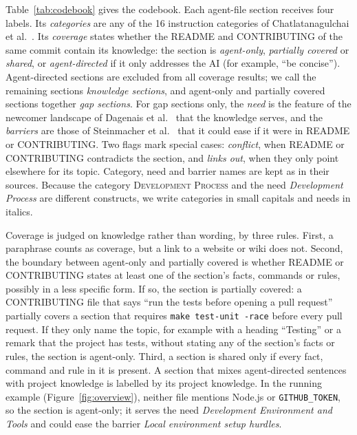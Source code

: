 \documentclass[sigconf,nonacm]{acmart}
\begin{document}
Table~\ref{tab:codebook} gives the codebook. Each agent-file section receives four labels. Its
\emph{categories} are any of the 16 instruction categories of Chatlatanagulchai et
al.~\cite{chatlatanagulchai2026agentreadmes}. Its \emph{coverage} states whether the README and
CONTRIBUTING of the same commit contain its knowledge: the section is \emph{agent-only},
\emph{partially covered} or \emph{shared}, or \emph{agent-directed} if it only addresses the AI (for
example, ``be concise''). Agent-directed sections are excluded from all coverage results; we call the
remaining sections \emph{knowledge sections}, and agent-only and partially covered sections
together \emph{gap sections}. For gap sections only, the \emph{need} is the feature of the newcomer
landscape of Dagenais et al.~\cite{dagenais2010landscape} that the knowledge serves, and the
\emph{barriers} are those of Steinmacher et al.~\cite{steinmacher2015barriers,santos2024onboarding}
that it could ease if it were in README or CONTRIBUTING. Two flags mark special cases:
\emph{conflict}, when README or CONTRIBUTING contradicts the section, and \emph{links out}, when they
only point elsewhere for its topic. Category, need and barrier names are kept as in their sources.
Because the category \textsc{Development Process} and the need \emph{Development Process} are
different constructs, we write categories in small capitals and needs in italics.

Coverage is judged on knowledge rather than wording, by three rules. First, a paraphrase counts as
coverage, but a link to a website or wiki does not. Second, the boundary between agent-only and
partially covered is whether README or CONTRIBUTING states at least one of the section's facts,
commands or rules, possibly in a less specific form. If so, the section is partially covered: a
CONTRIBUTING file that says ``run the tests before opening a pull request'' partially covers a
section that requires \texttt{make test-unit -race} before every pull request. If they only name the
topic, for example with a heading ``Testing'' or a remark that the project has tests, without
stating any of the section's facts or rules, the section is agent-only. Third, a section is shared
only if every fact, command and rule in it is present. A section that mixes agent-directed sentences
with project knowledge is labelled by its project knowledge. In the running example
(Figure~\ref{fig:overview}), neither file mentions Node.js or \texttt{GITHUB\_TOKEN}, so the section
is agent-only; it serves the need \emph{Development Environment and Tools} and could ease the barrier
\emph{Local environment setup hurdles}.
\end{document}
